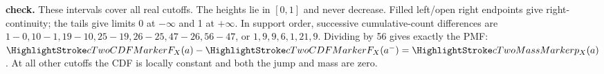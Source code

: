   \textbf{ check.} These intervals cover all real cutoffs.
  The heights lie in $[0,1]$ and never decrease. Filled left/open right endpoints give right-continuity;
  the tails give limits 0 at $-\infty$ and 1 at $+\infty$.
  In support order, successive cumulative-count differences are
  $1-0,10-1,19-10,25-19,26-25,47-26,56-47$, or $1,9,9,6,1,21,9$.
  Dividing by 56 gives exactly the PMF:
  $\cTwoCDFHL{F_X(a)}-\cTwoCDFHL{F_X(a^-)}=\cTwoMassHL{p_X(a)}$.
  At all other cutoffs the CDF is locally constant and both the jump and mass are zero.
  \vfill
  \clearpage
  \endgroup %
\fi

